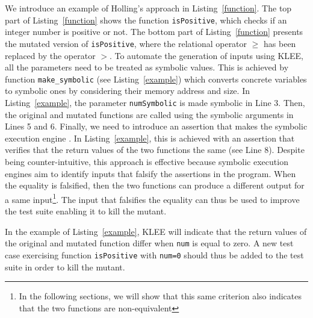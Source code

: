 We introduce an example of Holling's approach in Listing~\ref{function}. The top part of Listing~\ref{function} shows the function \texttt{isPositive}, which checks if an integer number is positive or not. The bottom part of Listing~\ref{function} presents the mutated version of \texttt{isPositive}, where the relational operator $\geq$ has been replaced by the operator $>$.
To automate the generation of inputs using KLEE, all the parameters need to be treated as symbolic values.
This is achieved by function \texttt{make\_symbolic} (see Listing~\ref{example}) which converts concrete variables to symbolic ones by considering their memory address and size. 
In Listing~\ref{example}, the parameter \texttt{numSymbolic} is made symbolic in Line 3. Then, the original and mutated functions are called using the symbolic arguments in Lines 5 and 6.
Finally, we need to introduce an assertion that makes the symbolic execution engine . 
In Listing~\ref{example}, this is achieved with an assertion that verifies that the return values of the two functions the same (see Line 8). 
Despite being counter-intuitive, this approach is effective because symbolic execution engines aim to identify inputs that falsify the assertions in the program. 
When the equality is falsified, then the two functions can produce a different output for a same input\footnote{In the following sections, we will show that this same criterion also indicates that the two functions are non-equivalent}.
The input that falsifies the equality can thus be used to improve the test suite enabling it to kill the mutant.

In the example of Listing~\ref{example}, KLEE will indicate that the return values of the original and mutated function differ when \texttt{num} is equal to zero.
A new test case exercising function \texttt{isPositive} with \texttt{num=0} should thus be added to the test suite in order to kill the mutant.

